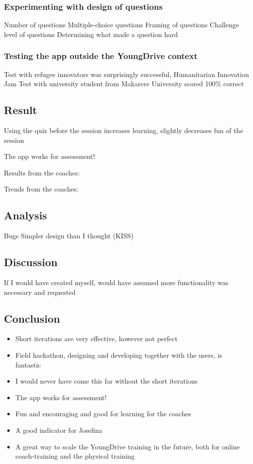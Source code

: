 \subsubsection{Experimenting with design of questions}
Number of questions
Multiple-choice questions
Framing of questions
Challenge level of questions
Determining what made a question hard

\subsubsection{Testing the app outside the YoungDrive context}
Test with refugee innovators was surprisingly successful, Humanitarian Innovation Jam
Test with university student from Makarere University scored 100\% correct

\subsection*{Result}
Using the quiz before the session increases learning, slightly decreases fun of the session

The app works for assessment!

Results from the coaches:

Trends from the coaches:

\subsection*{Analysis}
Bugs
Simpler design than I thought (KISS)

\subsection*{Discussion}
If I would have created myself, would have assumed more functionality was necessary and requested

\subsection*{Conclusion}
\begin{itemize}
\item Short iterations are very effective, however not perfect
\item Field hackathon, designing and developing together with the users, is fantastic
\item I would never have come this far without the short iterations
\item The app works for assessment!
\item Fun and encouraging and good for learning for the coaches
\item A good indicator for Josefina
\item A great way to scale the YoungDrive training in the future, both for online coach-training and the physical training
\end{itemize}
